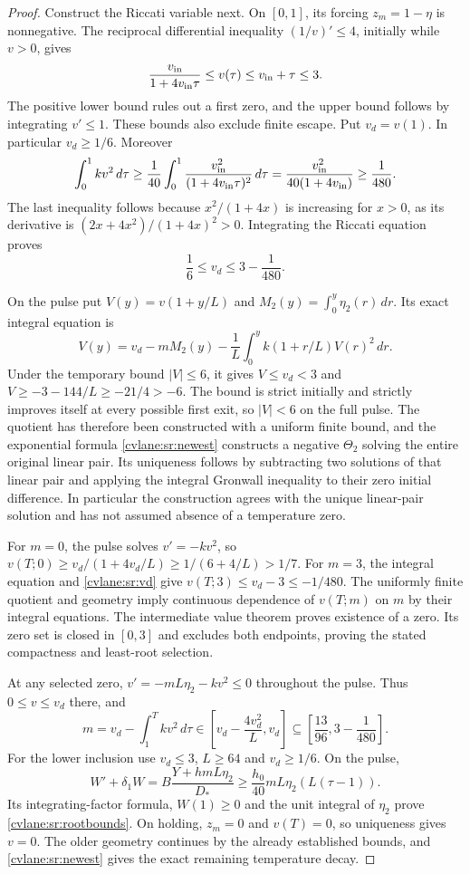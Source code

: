 \begin{proof}
Construct the Riccati variable next. On $[0,1]$, its forcing
$z_m=1-\eta$ is nonnegative. The reciprocal differential inequality
$(1/v)'\leq4$, initially while $v>0$, gives
\begin{equation}\label{cvlane:sr:v-ramp}
 \frac{v_{\rm in}}{1+4v_{\rm in}\tau}
 \leq v(\tau)\leq v_{\rm in}+\tau\leq3.
\end{equation}
The positive lower bound rules out a first zero, and the upper bound
follows by integrating $v'\leq1$. These bounds also exclude finite
escape. Put $v_d=v(1)$. In particular $v_d\geq1/6$.
Moreover
\[
 \int_0^1kv^2\,d\tau
 \geq\frac1{40}\int_0^1
       \frac{v_{\rm in}^2}{(1+4v_{\rm in}\tau)^2}\,d\tau
 =\frac{v_{\rm in}^2}{40(1+4v_{\rm in})}
 \geq\frac1{480}.
\]
The last inequality follows because $x^2/(1+4x)$ is increasing
for $x>0$, as its derivative is $(2x+4x^2)/(1+4x)^2>0$.
Integrating the Riccati equation proves
\begin{equation}\label{cvlane:sr:vd}
 \frac16\leq v_d\leq3-\frac1{480}.
\end{equation}

On the pulse put $V(y)=v(1+y/L)$ and
$M_2(y)=\int_0^y\eta_2(r)\,dr$. Its exact integral equation is
\[
 V(y)=v_d-mM_2(y)
       -\frac1L\int_0^y k(1+r/L)V(r)^2\,dr.
\]
Under the temporary bound $|V|\leq6$, it gives
$V\leq v_d<3$ and
$V\geq-3-144/L\geq-21/4>-6$.
The bound is strict initially and strictly improves itself at every
possible first exit, so $|V|<6$ on the full pulse. The quotient has
therefore been constructed with a uniform finite bound, and the
exponential formula \eqref{cvlane:sr:newest} constructs a negative
$\Theta_2$ solving the entire original linear pair. Its uniqueness
follows by subtracting two solutions of that linear pair and applying
the integral Gronwall inequality to their zero initial difference.
In particular the construction agrees with the unique linear-pair
solution and has not assumed absence of a temperature zero.

For $m=0$, the pulse solves $v'=-kv^2$, so
$v(T;0)\geq v_d/(1+4v_d/L)\geq1/(6+4/L)>1/7$.
For $m=3$, the integral equation and \eqref{cvlane:sr:vd} give
$v(T;3)\leq v_d-3\leq-1/480$.
The uniformly finite quotient and geometry imply continuous
dependence of $v(T;m)$ on $m$ by their integral equations.
The intermediate value theorem proves existence of a zero. Its
zero set is closed in $[0,3]$ and excludes both endpoints, proving
the stated compactness and least-root selection.

At any selected zero, $v'=-mL\eta_2-kv^2\leq0$ throughout
the pulse. Thus $0\leq v\leq v_d$ there, and
\[
 m=v_d-\int_1^Tkv^2\,d\tau
 \in\left[v_d-\frac{4v_d^2}{L},v_d\right]
 \subseteq\left[\frac{13}{96},3-\frac1{480}\right].
\]
For the lower inclusion use $v_d\leq3$, $L\geq64$ and
$v_d\geq1/6$. On the pulse,
\[
 W'+\delta_1W
 =B\frac{Y+hmL\eta_2}{D_*}
 \geq\frac{h_0}{40}mL\eta_2(L(\tau-1)).
\]
Its integrating-factor formula, $W(1)\geq0$ and the unit integral
of $\eta_2$ prove \eqref{cvlane:sr:rootbounds}.
On holding, $z_m=0$ and $v(T)=0$, so uniqueness gives $v=0$.
The older geometry continues by the already established bounds,
and \eqref{cvlane:sr:newest} gives the exact remaining temperature decay.


\end{proof}
